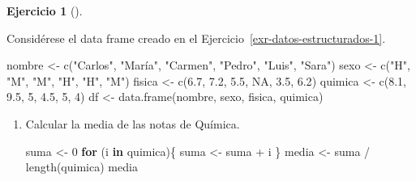 \documentclass[
  a4paper,
]{scrreport}
\newenvironment{Shaded}{\begin{snugshade}}{\end{snugshade}}
\newcommand{\ConstantTok}[1]{\textcolor[rgb]{0.56,0.35,0.01}{#1}}
\newcommand{\ControlFlowTok}[1]{\textcolor[rgb]{0.00,0.23,0.31}{\textbf{#1}}}
\newcommand{\DecValTok}[1]{\textcolor[rgb]{0.68,0.00,0.00}{#1}}
\newcommand{\FloatTok}[1]{\textcolor[rgb]{0.68,0.00,0.00}{#1}}
\newcommand{\FunctionTok}[1]{\textcolor[rgb]{0.28,0.35,0.67}{#1}}
\newcommand{\NormalTok}[1]{\textcolor[rgb]{0.00,0.23,0.31}{#1}}
\newcommand{\OtherTok}[1]{\textcolor[rgb]{0.00,0.23,0.31}{#1}}
\newcommand{\SpecialCharTok}[1]{\textcolor[rgb]{0.37,0.37,0.37}{#1}}
\newcommand{\StringTok}[1]{\textcolor[rgb]{0.13,0.47,0.30}{#1}}
\theoremstyle{definition}
\newtheorem{exercise}{Ejercicio}[chapter]
\theoremstyle{definition}
\theoremstyle{remark}
\begin{document}
\begin{exercise}[]\protect\hypertarget{exr-estructuras-control-1}{}\label{exr-estructuras-control-1}

Considérese el data frame creado en el
Ejercicio~\ref{exr-datos-estructurados-1}.

\begin{Shaded}
\begin{Highlighting}[]
\NormalTok{nombre }\OtherTok{\textless{}{-}} \FunctionTok{c}\NormalTok{(}\StringTok{"Carlos"}\NormalTok{, }\StringTok{"María"}\NormalTok{, }\StringTok{"Carmen"}\NormalTok{, }\StringTok{"Pedro"}\NormalTok{, }\StringTok{"Luis"}\NormalTok{, }\StringTok{"Sara"}\NormalTok{)}
\NormalTok{sexo }\OtherTok{\textless{}{-}} \FunctionTok{c}\NormalTok{(}\StringTok{"H"}\NormalTok{, }\StringTok{"M"}\NormalTok{, }\StringTok{"M"}\NormalTok{, }\StringTok{"H"}\NormalTok{, }\StringTok{"H"}\NormalTok{, }\StringTok{"M"}\NormalTok{)}
\NormalTok{fisica }\OtherTok{\textless{}{-}} \FunctionTok{c}\NormalTok{(}\FloatTok{6.7}\NormalTok{, }\FloatTok{7.2}\NormalTok{, }\FloatTok{5.5}\NormalTok{, }\ConstantTok{NA}\NormalTok{, }\FloatTok{3.5}\NormalTok{, }\FloatTok{6.2}\NormalTok{)}
\NormalTok{quimica }\OtherTok{\textless{}{-}} \FunctionTok{c}\NormalTok{(}\FloatTok{8.1}\NormalTok{, }\FloatTok{9.5}\NormalTok{, }\DecValTok{5}\NormalTok{, }\FloatTok{4.5}\NormalTok{, }\DecValTok{5}\NormalTok{, }\DecValTok{4}\NormalTok{)}
\NormalTok{df }\OtherTok{\textless{}{-}} \FunctionTok{data.frame}\NormalTok{(nombre, sexo, fisica, quimica)}
\end{Highlighting}
\end{Shaded}

\begin{enumerate}
\def\labelenumi{\alph{enumi}.}
\item
  Calcular la media de las notas de Química.

  \begin{tcolorbox}[enhanced jigsaw, title=\textcolor{quarto-callout-note-color}{\faInfo}\hspace{0.5em}{Solución}, titlerule=0mm, toprule=.15mm, colbacktitle=quarto-callout-note-color!10!white, arc=.35mm, colframe=quarto-callout-note-color-frame, opacitybacktitle=0.6, coltitle=black, left=2mm, colback=white, opacityback=0, breakable, bottomrule=.15mm, toptitle=1mm, leftrule=.75mm, bottomtitle=1mm, rightrule=.15mm]

\begin{Shaded}
\begin{Highlighting}[]
\NormalTok{suma }\OtherTok{\textless{}{-}} \DecValTok{0}
\ControlFlowTok{for}\NormalTok{ (i }\ControlFlowTok{in}\NormalTok{ quimica)\{}
\NormalTok{  suma }\OtherTok{\textless{}{-}}\NormalTok{ suma }\SpecialCharTok{+}\NormalTok{ i}
\NormalTok{\}}
\NormalTok{media }\OtherTok{\textless{}{-}}\NormalTok{ suma }\SpecialCharTok{/} \FunctionTok{length}\NormalTok{(quimica)}
\NormalTok{media}
\end{Highlighting}
\end{Shaded}


\end{tcolorbox}
\end{enumerate}
\end{exercise}
\end{document}

